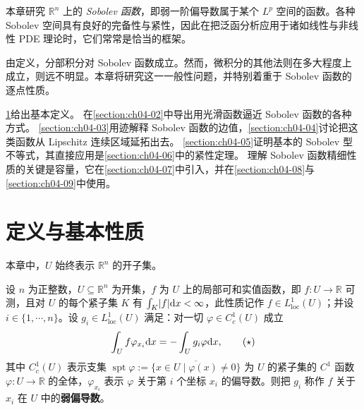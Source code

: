 \documentclass[../../main.tex]{subfiles}%
\begin{document}
本章研究 $\mathbb{R}^{n}$ 上的 \emph{Sobolev 函数}，即弱一阶偏导数属于某个 $L^{p}$ 空间的函数。各种 Sobolev 空间具有良好的完备性与紧性，因此在把泛函分析应用于诸如线性与非线性 PDE 理论时，它们常常是恰当的框架。

由定义，分部积分对 Sobolev 函数成立。然而，微积分的其他法则在多大程度上成立，则远不明显。本章将研究这一一般性问题，并特别着重于 Sobolev 函数的逐点性质。

\cref{section:ch04-01}给出基本定义。%
在\cref{section:ch04-02}中导出用光滑函数逼近 Sobolev 函数的各种方式。%
\cref{section:ch04-03}用迹解释 Sobolev 函数的边值，\cref{section:ch04-04}讨论把这类函数从 Lipschitz 连续区域延拓出去。%
\cref{section:ch04-05}证明基本的 Sobolev 型不等式，其直接应用是\cref{section:ch04-06}中的紧性定理。%
理解 Sobolev 函数精细性质的关键是容量，它在\cref{section:ch04-07}中引入，并在\cref{section:ch04-08}与\cref{section:ch04-09}中使用。%

\section{定义与基本性质}\label{section:ch04-01}

本章中，$U$ 始终表示 $\mathbb{R}^{n}$ 的开子集。

\begin{definition}[弱偏导数]\label{definition:ch04-4-1}
设 $n$ 为正整数，$U\subseteq\mathbb{R}^{n}$ 为开集，$f$ 为 $U$ 上的局部可和实值函数，即 $f:U\to\mathbb{R}$ 可测，且对 $U$ 的每个紧子集 $K$ 有 $\int_{K}\lvert f\rvert\mathrm{d} x<\infty$，此性质记作 $f\in L^{1}_{\mathrm{loc}}(U)$；并设 $i\in\{1,\cdots,n\}$。设 $g_i\in L^{1}_{\mathrm{loc}}(U)$ 满足：对一切 $\varphi\in C_c^{1}(U)$ 成立
\begin{align*}
\int_{U}f\varphi_{x_i}\mathrm{d} x=-\int_{U}g_i\varphi\mathrm{d} x ,\qquad(\star)
\end{align*}
其中 $C_c^{1}(U)$ 表示支集 $\operatorname{spt}\varphi:=\overline{\{x\in U\mid\varphi(x)\neq0\}}$ 为 $U$ 的紧子集的 $C^{1}$ 函数 $\varphi:U\to\mathbb{R}$ 的全体，$\varphi_{x_i}$ 表示 $\varphi$ 关于第 $i$ 个坐标 $x_i$ 的偏导数。则把 $g_i$ 称作 $f$ 关于 $x_i$ 在 $U$ 中的\textbf{弱偏导数}。
\end{definition}
\end{document}
